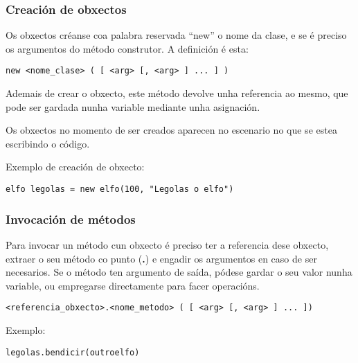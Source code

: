 \subsubsection{Creación de obxectos}
Os obxectos créanse coa palabra reservada ``new'' o nome da clase, e se é
preciso os argumentos do método construtor. A definición é esta:
\begin{lstlisting}
new <nome_clase> ( [ <arg> [, <arg> ] ... ] )
\end{lstlisting} 
\par Ademais de crear o obxecto, este método devolve unha referencia ao mesmo,
que pode ser gardada nunha variable mediante unha asignación.
\par
Os obxectos no momento de ser creados aparecen no escenario no que se
estea escribindo o código.
\par Exemplo de creación de obxecto:
\begin{lstlisting}
elfo legolas = new elfo(100, "Legolas o elfo")
\end{lstlisting}

\subsubsection{Invocación de métodos}
Para invocar un método cun obxecto é preciso ter a referencia dese obxecto,
extraer o seu método co punto ({\bf .}) e engadir os argumentos en caso de ser
necesarios. Se o método ten argumento de saída, pódese gardar o seu valor nunha
variable, ou empregarse directamente para facer operacións.
\begin{lstlisting}
<referencia_obxecto>.<nome_metodo> ( [ <arg> [, <arg> ] ... ])
\end{lstlisting} 
\par Exemplo:
\begin{lstlisting}
legolas.bendicir(outroelfo)
\end{lstlisting}

